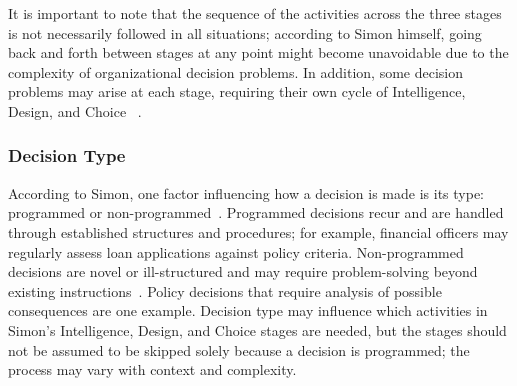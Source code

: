 \documentclass{sfuthesis}
\begin{document}
It is important to note that the sequence of the activities across the three stages is not necessarily followed in all situations; according to Simon himself, going back and forth between stages at any point might become unavoidable due to the complexity of organizational decision problems. In addition, some decision problems may arise at each stage, requiring their own cycle of Intelligence, Design, and Choice ~\cite{simon1960new}.
\subsubsection{Decision Type}
According to Simon, one factor influencing how a decision is made is its type: programmed or non-programmed~\cite{simon1960new}. Programmed decisions recur and are handled through established structures and procedures; for example, financial officers may regularly assess loan applications against policy criteria. Non-programmed decisions are novel or ill-structured and may require problem-solving beyond existing instructions~\cite{simon1960new}. Policy decisions that require analysis of possible consequences are one example. Decision type may influence which activities in Simon's Intelligence, Design, and Choice stages are needed, but the stages should not be assumed to be skipped solely because a decision is programmed; the process may vary with context and complexity.
\end{document}
